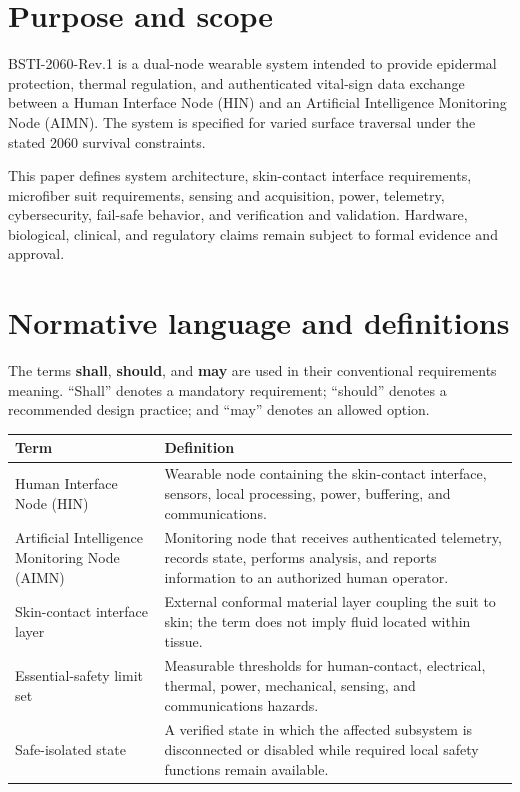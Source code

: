 \documentclass[11pt,a4paper]{article}
\begin{document}
\tableofcontents
\clearpage
{}

\section{Purpose and scope}\label{sec:purpose}
BSTI-2060-Rev.1 is a dual-node wearable system intended to provide epidermal protection, thermal regulation, and authenticated vital-sign data exchange between a Human Interface Node (HIN) and an Artificial Intelligence Monitoring Node (AIMN). The system is specified for varied surface traversal under the stated 2060 survival constraints.

This paper defines system architecture, skin-contact interface requirements, microfiber suit requirements, sensing and acquisition, power, telemetry, cybersecurity, fail-safe behavior, and verification and validation. Hardware, biological, clinical, and regulatory claims remain subject to formal evidence and approval.

\section{Normative language and definitions}\label{sec:terms}
The terms \textbf{shall}, \textbf{should}, and \textbf{may} are used in their conventional requirements meaning. “Shall” denotes a mandatory requirement; “should” denotes a recommended design practice; and “may” denotes an allowed option.

\begin{longtable}{p{}p{}}
\toprule
\textbf{Term} & \textbf{Definition}\\
\midrule
Human Interface Node (HIN) & Wearable node containing the skin-contact interface, sensors, local processing, power, buffering, and communications.\\
Artificial Intelligence Monitoring Node (AIMN) & Monitoring node that receives authenticated telemetry, records state, performs analysis, and reports information to an authorized human operator.\\
Skin-contact interface layer & External conformal material layer coupling the suit to skin; the term does not imply fluid located within tissue.\\
Essential-safety limit set & Measurable thresholds for human-contact, electrical, thermal, power, mechanical, sensing, and communications hazards.\\
Safe-isolated state & A verified state in which the affected subsystem is disconnected or disabled while required local safety functions remain available.\\
\bottomrule
\end{longtable}
\end{document}
